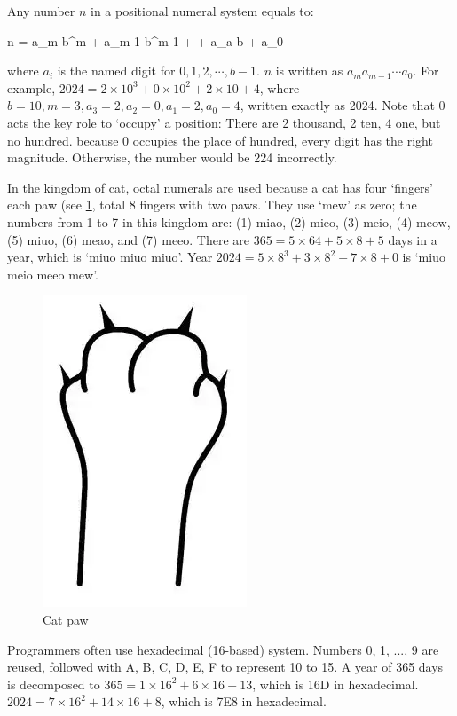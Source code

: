 \documentclass[b5paper]{article}
\begin{document}
Any number $n$ in a positional numeral system equals to:

\be
n = a_m b^m + a_{m-1} b^{m-1} + \cdots + a_a b + a_0
\label{eq:pos-rep}
\ee

where $a_i$ is the named digit for $0, 1, 2, \cdots, b-1$. $n$ is written as $a_ma_{m-1} \cdots a_0$. For example, $2024 = 2 \times 10^3 + 0 \times 10^2 + 2 \times 10 + 4$, where $b = 10, m = 3, a_3 = 2, a_2 = 0, a_1 = 2, a_0 = 4$, written exactly as 2024. Note that 0 acts the key role to `occupy' a position: There are 2 thousand, 2 ten, 4 one, but no hundred. because 0 occupies the place of hundred, every digit has the right magnitude. Otherwise, the number would be 224 incorrectly.

\begin{example}
In the kingdom of cat, octal numerals are used because a cat has four `fingers' each paw (see \cref{fig:cat-paw}, total 8 fingers with two paws. They use `mew' as zero; the numbers from 1 to 7 in this kingdom are: (1) miao, (2) mieo, (3) meio, (4) meow, (5) miuo, (6) meao, and (7) meeo. There are $365 = 5 \times 64 + 5 \times 8 + 5$ days in a year, which is `miuo miuo miuo'. Year $2024 = 5 \times 8^3 + 3 \times 8^2 + 7 \times 8 + 0$ is `miuo meio meeo mew'.

\begin{figure}[htbp]
 \centering
 \includegraphics[scale=0.6]{img/cat-paw}
 \caption{Cat paw}
 \label{fig:cat-paw}
\end{figure}

\end{example}

\begin{example}
Programmers often use hexadecimal (16-based) system. Numbers 0, 1, ..., 9 are reused, followed with A, B, C, D, E, F to represent 10 to 15. A year of 365 days is decomposed to $365 = 1 \times 16^2 + 6 \times 16 + 13$, which is 16D in hexadecimal. $2024 = 7 \times 16^2 + 14 \times 16 + 8$, which is 7E8 in hexadecimal.
\end{example}
\end{document}
